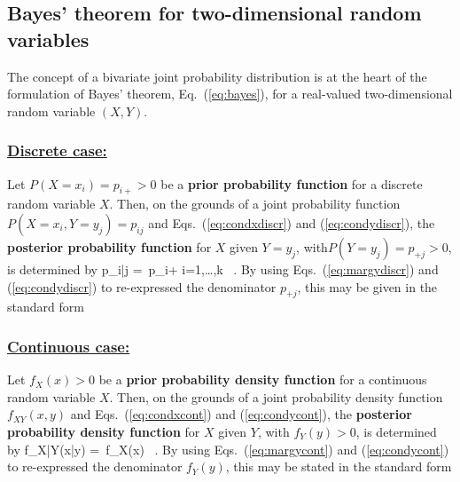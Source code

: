 \subsection[Bayes' theorem for two-dimensional random variables]{Bayes' theorem for two-dimensional random variables}
The concept of a bivariate joint probability distribution is at 
the heart of the formulation of Bayes' theorem, 
Eq.~(\ref{eq:bayes}), for a real-valued two-dimensional random 
variable $(X,Y)$.

\subsubsection[Discrete case]{\underline{Discrete case:}}
Let $P(X=x_{i}) = p_{i+} > 0$ be a \textbf{prior probability 
function} for a discrete random variable $X$. Then, on the grounds 
of a joint probability function $P(X=x_{i},Y=y_{j}) = p_{ij}$ and
Eqs.~(\ref{eq:condxdiscr}) and (\ref{eq:condydiscr}), the
\textbf{posterior probability function} for $X$ given $Y=y_{j}$,
with$P(Y=y_{j}) = p_{+j} > 0$, is determined by
%
\be
p_{i|j} = \,p_{i+}
\quad\quad{}\quad i=1,\ldots,k \ .
\ee
%
By using Eqs.~(\ref{eq:margydiscr}) and (\ref{eq:condydiscr}) to 
re-expressed the denominator $p_{+j}$, this may be given in the 
standard form
%
\be
{}
\ee
%

\subsubsection[Continous case]{\underline{Continuous case:}}
Let $f_{X}(x) > 0$ be a \textbf{prior probability density function} 
for a continuous random variable $X$. Then, on the grounds 
of a joint probability density function $f_{XY}(x,y)$ and
Eqs.~(\ref{eq:condxcont}) and (\ref{eq:condycont}), the
\textbf{posterior probability density function} for $X$ given $Y$,
with $f_{Y}(y)>0$, is determined by
%
\be
f_{X|Y}(x|y) = \,f_{X}(x) \ .
\ee
%
By using Eqs.~(\ref{eq:margycont}) and (\ref{eq:condycont}) to 
re-expressed the denominator $f_{Y}(y)$, this may be stated in the 
standard form
%
\be
{}
\ee
%

